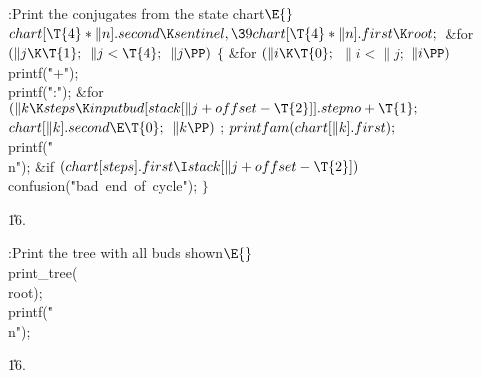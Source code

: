 \Y\B\4:Print the conjugates from the state chart\X${}\E{}$\6
$\\{chart}[\T{4}*\|n].\\{second}\K\\{sentinel},\39\\{chart}[\T{4}*\|n].%
\\{first}\K\\{root};{}$\6
\&{for} ${}(\|j\K\T{1};{}$ ${}\|j<\T{4};{}$ ${}\|j\PP){}$\5
${}\{{}$\1\6
\&{for} ${}(\|i\K\T{0};{}$ ${}\|i<\|j;{}$ ${}\|i\PP){}$\1\5
\\{printf}(\.{"+"});\2\6
\\{printf}(\.{":"});\6
\&{for} ${}(\|k\K\\{steps}\K\\{inputbud}[\\{stack}[\|j+\\{offset}-\T{2}]].%
\\{stepno}+\T{1};{}$ ${}\\{chart}[\|k].\\{second}\E\T{0};{}$ ${}\|k\PP){}$\1\5
;\2\6
${}\\{printfam}(\\{chart}[\|k].\\{first});{}$\6
\\{printf}(\.{"\\n"});\6
\&{if} ${}(\\{chart}[\\{steps}].\\{first}\I\\{stack}[\|j+\\{offset}-\T{2}]){}$%
\1\5
\\{confusion}(\.{"bad\ end\ of\ cycle"});\2\6
\4${}\}{}$\2\par
\U16.\fi

\B{}:Print the tree with all buds shown\X${}\E{}$\6
\\{print\_tree}(\\{root});\6
\\{printf}(\.{"\\n"});\par
\U16.\fi

